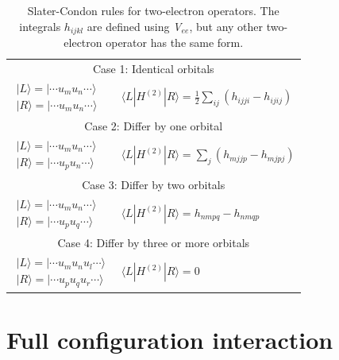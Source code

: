 \documentclass[11pt,oneside,final]{huthesis}%
\begin{document}
\begin{table}
	\begin{center}
\begin{tabular}{ll}  
\hline
\multicolumn{2}{c}{Case 1: Identical orbitals}\\[1.5ex]
$\begin{array}{c}
|L\rangle =|\cdots u_{m} u_{n} \cdots \rangle\\
|R\rangle =|\cdots u_{m} u_{n} \cdots \rangle
\end{array}$
  & $\langle L|H^{(2)} |R\rangle =\frac{1}{2} \sum _{ij}(h_{ijji} -h_{ijij})  $ \\[5ex]
\multicolumn{2}{c}{Case 2: Differ by one orbital}\\[1.5ex]
$\begin{array}{c}
|L\rangle =|\cdots u_{m} u_{n} \cdots \rangle \\ 
|R\rangle =|\cdots u_{p} u_{n} \cdots \rangle
\end{array}$
& $\langle L|H^{(2)} |R\rangle =\sum _{j}(h_{mjjp} -h_{mjpj})  $ \\[5ex]
\multicolumn{2}{c}{Case 3: Differ by two orbitals}\\[1.5ex]
$\begin{array}{c}
|L\rangle =|\cdots u_{m} u_{n} \cdots \rangle \\ 
|R\rangle =|\cdots u_{p} u_{q} \cdots \rangle 
\end{array}$& $\langle L|H^{(2)} |R\rangle =h_{nmpq} -h_{nmqp} $ \\[5ex]
\multicolumn{2}{c}{Case 4: Differ by three or more orbitals}\\[1.5ex]
$\begin{array}{c}
|L\rangle =|\cdots u_{m} u_{n} u_{l} \cdots \rangle  \\ 
|R\rangle =|\cdots u_{p} u_{q} u_{r} \cdots \rangle 
\end{array}$
&$\langle L|H^{(2)} |R\rangle =0$ \\[2ex] \hline 
\end{tabular}
\caption{Slater-Condon rules for two-electron operators. The integrals $h_{ijkl} $ are defined using \textit{V}${}_{ee }$, but any other two-electron operator has the same form.}\label{tbl:sc2}
\end{center}
\end{table}

\section{Full configuration interaction}
\end{document}
